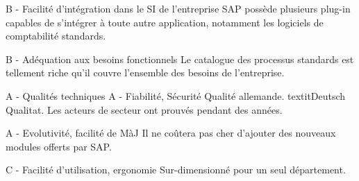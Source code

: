 B - Facilité d'intégration dans le SI de l'entreprise
	SAP possède plusieurs \og plug-in \fg\, capables de s'intégrer à toute autre application, notamment les logiciels de comptabilité standards.
	
B - Adéquation aux besoins fonctionnels
	Le catalogue des processus standards est tellement riche qu'il couvre l'ensemble des besoins de l'entreprise.
	
A - Qualités techniques
	A - Fiabilité, Sécurité
		Qualité allemande. textit{Deutsch Qualitat}. Les acteurs de secteur ont prouvés pendant des années.
	
	A - Evolutivité, facilité de MàJ
		Il ne coûtera pas cher d'ajouter des nouveaux modules offerts par SAP. 

	C - Facilité d'utilisation, ergonomie
		Sur-dimensionné pour un seul département.
